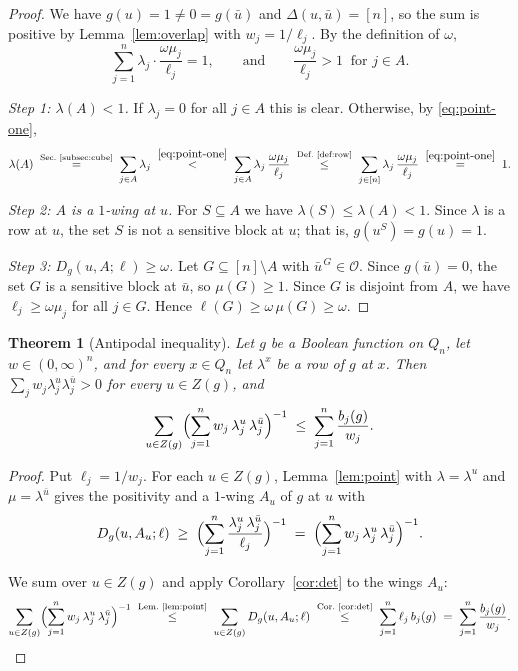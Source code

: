 \documentclass[11pt,reqno]{amsart}
\newtheorem{theorem}{Theorem}[section]
\theoremstyle{definition}
\theoremstyle{remark}
\numberwithin{equation}{section}
\theoremstyle{named}
\theoremstyle{plain}
\newcommand{\cO}{\mathcal{O}}
\begin{document}
\begin{proof}
We have $g(u)=1\ne0=g(\bar u)$ and $\Delta(u,\bar u)=[n]$, so the sum is positive by
Lemma~\ref{lem:overlap} with $w_j=1/\ell_j$. By the definition of $\omega$,
\begin{equation}\label{eq:point-one}
   \sum_{j=1}^{n}\lambda_j\cdot\frac{\omega\mu_j}{\ell_j}=1,\qquad\text{and}\qquad
   \frac{\omega\mu_j}{\ell_j}>1\ \text{ for }j\in A .
\end{equation}

\smallskip
\emph{Step 1: $\lambda(A)<1$.} If $\lambda_j=0$ for all $j\in A$ this is clear. Otherwise, by
\eqref{eq:point-one},
\[
   \lambda(A)\;\overset{\text{Sec.~\ref{subsec:cube}}}{=}\;\sum_{j\in A}\lambda_j
   \;\overset{\eqref{eq:point-one}}{<}\;\sum_{j\in A}\lambda_j\,\frac{\omega\mu_j}{\ell_j}
   \;\overset{\text{Def.~\ref{def:row}}}{\le}\;\sum_{j\in[n]}\lambda_j\,\frac{\omega\mu_j}{\ell_j}
   \;\overset{\eqref{eq:point-one}}{=}\;1 .
\]

\smallskip
\emph{Step 2: $A$ is a $1$-wing at $u$.} For $S\subseteq A$ we have $\lambda(S)\le\lambda(A)<1$.
Since $\lambda$ is a row at $u$, the set $S$ is not a sensitive block at $u$; that is,
$g(u^{S})=g(u)=1$.

\smallskip
\emph{Step 3: $D_g(u,A;\ell)\ge\omega$.} Let $G\subseteq[n]\setminus A$ with $\bar u^{\,G}\in\cO$. Since
$g(\bar u)=0$, the set $G$ is a sensitive block at $\bar u$, so $\mu(G)\ge1$. Since $G$ is disjoint
from $A$, we have $\ell_j\ge\omega\mu_j$ for all $j\in G$. Hence $\ell(G)\ge\omega\,\mu(G)\ge\omega$.
\end{proof}

\begin{theorem}[Antipodal inequality]\label{thm:anti}
Let $g$ be a Boolean function on $Q_n$, let $w\in(0,\infty)^{n}$, and for every $x\in Q_n$ let
$\lambda^{x}$ be a row of $g$ at $x$. Then $\sum_{j}w_j\lambda^{u}_j\lambda^{\bar u}_j>0$ for every
$u\in Z(g)$, and
\[
   \sum_{u\in Z(g)}\Bigl(\sum_{j=1}^{n}w_j\,\lambda^{u}_j\,\lambda^{\bar u}_j\Bigr)^{-1}
   \;\le\;\sum_{j=1}^{n}\frac{b_j(g)}{w_j}.
\]
\end{theorem}

\begin{proof}
Put $\ell_j=1/w_j$. For each $u\in Z(g)$, Lemma~\ref{lem:point} with $\lambda=\lambda^{u}$ and
$\mu=\lambda^{\bar u}$ gives the positivity and a $1$-wing $A_u$ of $g$ at $u$ with
\[
   D_g(u,A_u;\ell)\;\ge\;\Bigl(\sum_{j=1}^{n}\frac{\lambda^{u}_j\,\lambda^{\bar u}_j}{\ell_j}\Bigr)^{-1}
   \;=\;\Bigl(\sum_{j=1}^{n}w_j\,\lambda^{u}_j\,\lambda^{\bar u}_j\Bigr)^{-1}.
\]

We sum over $u\in Z(g)$ and apply Corollary~\ref{cor:det} to the wings $A_u$:
\[
   \sum_{u\in Z(g)}\Bigl(\sum_{j=1}^{n}w_j\,\lambda^{u}_j\,\lambda^{\bar u}_j\Bigr)^{-1}
   \;\overset{\text{Lem.~\ref{lem:point}}}{\le}\;\sum_{u\in Z(g)}D_g(u,A_u;\ell)
   \;\overset{\text{Cor.~\ref{cor:det}}}{\le}\;\sum_{j=1}^{n}\ell_j\,b_j(g)
   \;=\;\sum_{j=1}^{n}\frac{b_j(g)}{w_j}.\qedhere
\]
\end{proof}
\end{document}
